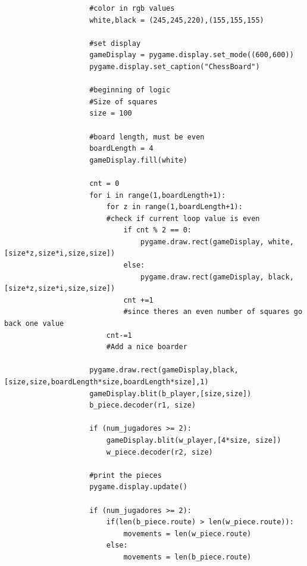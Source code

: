 \documentclass{article}
\begin{document}
\begin{lstlisting}
                    #color in rgb values
                    white,black = (245,245,220),(155,155,155)                
                    
                    #set display
                    gameDisplay = pygame.display.set_mode((600,600))
                    pygame.display.set_caption("ChessBoard")
                    
                    #beginning of logic
                    #Size of squares
                    size = 100
    
                    #board length, must be even
                    boardLength = 4
                    gameDisplay.fill(white)
    
                    cnt = 0
                    for i in range(1,boardLength+1):
                        for z in range(1,boardLength+1):
                        #check if current loop value is even
                            if cnt % 2 == 0:
                                pygame.draw.rect(gameDisplay, white,[size*z,size*i,size,size])
                            else:
                                pygame.draw.rect(gameDisplay, black, [size*z,size*i,size,size])
                            cnt +=1
                            #since theres an even number of squares go back one value
                        cnt-=1
                        #Add a nice boarder
                   
                    pygame.draw.rect(gameDisplay,black,[size,size,boardLength*size,boardLength*size],1)
                    gameDisplay.blit(b_player,[size,size])
                    b_piece.decoder(r1, size)
                    
                    if (num_jugadores >= 2):
                        gameDisplay.blit(w_player,[4*size, size])
                        w_piece.decoder(r2, size)
                    
                    #print the pieces
                    pygame.display.update()
                    
                    if (num_jugadores >= 2):
                        if(len(b_piece.route) > len(w_piece.route)):
                            movements = len(w_piece.route)
                        else:
                            movements = len(b_piece.route)
                        

\end{lstlisting}
\end{document}

